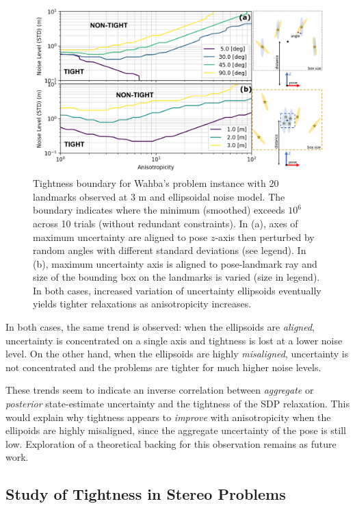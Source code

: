 \documentclass[lettersize,journal]{IEEEtran}
\newcommand{\rev}[1]{\color{red}{#1}\color{black}}
\begin{document}
\begin{figure}[!b]
	\centering
	\includegraphics[width=\columnwidth]{figs/ellipsoid_study}
	\caption{Tightness boundary for Wahba's problem instance with 20 landmarks observed at 3 m and ellipsoidal noise model. The boundary indicates where the minimum (smoothed) \rev{ER } exceeds $ 10^{6}$ across 10 trials (without redundant constraints). In (a), axes of maximum uncertainty are aligned to pose $z$-axis then perturbed by random angles with different standard deviations (see legend). In (b), maximum uncertainty axis is aligned to pose-landmark ray and size of the bounding box on the landmarks is varied (size in legend). In both cases, increased variation of uncertainty ellipsoids eventually yields tighter relaxations as anisotropicity increases.}
	\label{fig:wahba_axis_bnd}
\end{figure}
In both cases, the same trend is observed: when the ellipsoids are \textit{aligned}, uncertainty is concentrated on a single axis and tightness is lost at a lower noise level. On the other hand, when the ellipsoids are highly \textit{misaligned}, uncertainty is not concentrated and the problems are tighter for much higher noise levels. 

These trends seem to indicate an inverse correlation between \emph{aggregate} or \emph{posterior} state-estimate uncertainty and the tightness of the SDP relaxation. This would explain why tightness appears to \emph{improve} with anisotropicity when the ellipoids are highly misaligned, since the aggregate uncertainty of the pose is still low. Exploration of a theoretical backing for this observation remains as future work.

\subsection{Study of Tightness in Stereo Problems}
\end{document}
